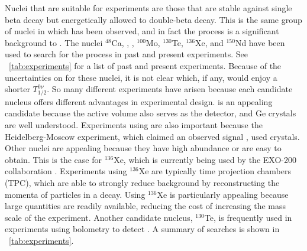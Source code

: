Nuclei that are suitable for \zvbb experiments are those that are stable against single beta decay but energetically allowed to double-beta decay.  This is the same group of nuclei in which \tvbb has been observed, and in fact the \tvbb process is a significant background to \zvbb.  The nuclei $^{48}$Ca, , , $^{100}$Mo, $^{130}$Te, $^{136}$Xe, and $^{150}$Nd have been used to search for the process in past and present experiments.  See {\tab}~\ref{tab:experiments} for a list of past and present experiments.  Because of the uncertainties on \NME for these nuclei, it is not clear which, if any, would enjoy a shorter $T^{0\nu}_{1/2}$.  So many different experiments have arisen because each candidate nucleus offers different advantages in experimental design.   is an appealing candidate because the active volume also serves as the detector, and Ge crystals are well understood.  Experiments using  are also important because the Heidelberg-Moscow experiment, which claimed an observed \zvbb signal \citep{KlapdorKleingrothaus}, used  crystals.  Other nuclei are appealing because they have high abundance or are easy to obtain.  This is the case for $^{136}$Xe, which is currently being used by the EXO-200 collaboration \citep{EXO200}.  Experiments using $^{136}$Xe are typically time projection chambers (TPC), which are able to strongly reduce background by reconstructing the momenta of particles in a decay.  Using $^{136}$Xe is particularly appealing because large quantities are readily available, reducing the cost of increasing the mass scale of the experiment.  Another candidate nucleus, $^{130}$Te, is frequently used in experiments using bolometry to detect \zvbb.  A summary of \zvbb searches is shown in {\tab}~\ref{tab:experiments}.
